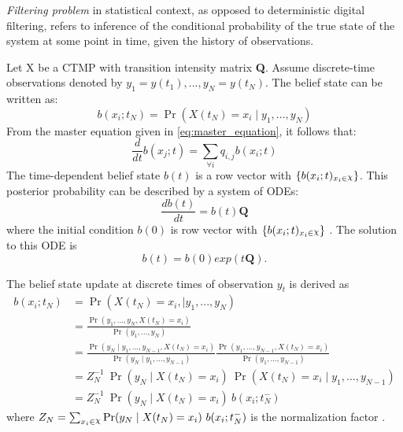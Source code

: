 \textit{Filtering problem} in statistical context, as opposed to deterministic digital filtering, refers to inference of the conditional probability of the true state of the system at some point in time, given the history of observations. \cite{Godsill2019}

Let X be a CTMP with transition intensity matrix \textbf{Q}. Assume discrete-time observations denoted by $ y_{1}=y(t_{1}), ..., y_{N}=y(t_{N}) $. The belief state can be written as:
\begin{equation}
	b(x_{i};t_{N}) = \operatorname{Pr}(X(t_{N}) = x_{i} \mid y_{1}, ..., y_{N})
\end{equation}
From the master equation given in \autoref{eq:master_equation}, it follows that:
\begin{equation}
 \frac{d}{dt} b(x_{j};t)  = \sum_{\forall i} q_{i,j} b(x_{i};t)
\end{equation}
The time-dependent belief state $ b(t) $ is a row vector with $ \left\lbrace b(x_{i};t)_{x_{i} \in \rchi}\right\rbrace  $.
This posterior probability can be described by a system of ODEs:
\begin{equation}
\frac{db(t)}{dt} = b(t)\textbf{Q}
\end{equation}
where the initial condition $ b(0) $ is row vector with $ \left\lbrace b(x_{i};t)_{x_{i} \in \rchi}\right\rbrace $ \cite{article}. The solution to this ODE is
\begin{equation}
b(t) = b(0) exp(t\textbf{Q}).
\label{eq:b_cont}
\end{equation}

The belief state update at discrete times of observation $ y_{t} $ is derived as 
\begin{align}
b(x_{i}; t_{N}) & = \operatorname{Pr}( X(t_{N}) = x_{i},\mid y_{1}, ..., y_{N}) \nonumber\\ & = \frac{\operatorname{Pr}(y_{1}, ..., y_{N}, X(t_{N}) = x_{i})}{\operatorname{Pr}(y_{1}, ..., y_{N})}  \nonumber\\ & = \frac{\operatorname{Pr}(y_{N} \mid y_{1}, ..., y_{N-1}, X(t_{N}) = x_{i})}{\operatorname{Pr}(y_{N} \mid y_{1}, ..., y_{N-1})} \frac{\operatorname{Pr}(y_{1}, ..., y_{N-1}, X(t_{N}) = x_{i})}{\operatorname{Pr}(y_{1}, ..., y_{N-1})}  \nonumber\\ & = Z_{N}^{-1} \ \operatorname{Pr}(y_{N} \mid X(t_{N})=x_{i})\ \operatorname{Pr}( X(t_{N}) = x_{i}\mid y_{1}, ..., y_{N-1})  \nonumber\\ & = Z_{N}^{-1}\ {\operatorname{Pr}(y_{N} \mid X(t_{N})=x_{i})}\ {b(x_{i}; t_{N}^{-})}
\label{eq:b_jump}
\end{align}
where $ Z_{N} = \sum_{x_{i}\in \rchi} \operatorname{Pr}(y_{N} \mid X(t_{N})=x_{i})\ b(x_{i}; t_{N}^{-}) $ is the normalization factor \cite{article}.

